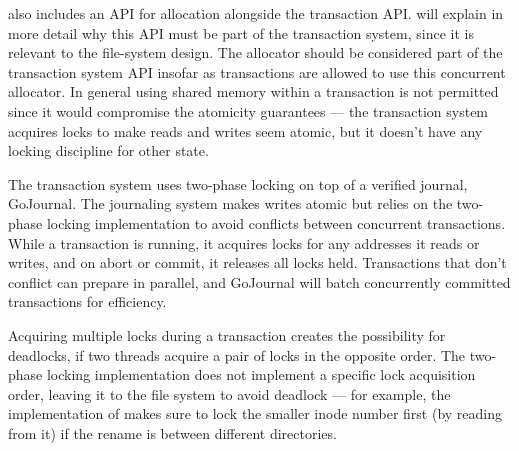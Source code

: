  also includes an API for allocation alongside the
transaction API.\@ {} will explain in more detail why this
API must be part of the transaction system, since it is relevant to the
file-system design. The allocator should be considered part of the transaction
system API insofar as transactions are allowed to use this concurrent allocator.
In general using shared memory within a transaction is not permitted since it
would compromise the atomicity guarantees --- the transaction system acquires
locks to make reads and writes seem atomic, but it doesn't have any locking
discipline for other state.



The transaction system uses two-phase locking on top of a verified journal,
GoJournal. The journaling system makes writes atomic but relies on the two-phase
locking implementation to avoid conflicts between concurrent transactions.
While a transaction is running, it acquires locks for
any addresses it reads or writes, and on abort or commit, it releases
all locks held. Transactions that don't conflict can prepare in
parallel, and GoJournal will batch concurrently committed
transactions for efficiency.

Acquiring multiple locks during a transaction creates the possibility
for deadlocks, if two threads acquire a pair of locks in the opposite
order. The two-phase locking implementation does not implement a
specific lock acquisition order, leaving it to the file system to
avoid deadlock --- for example, the implementation of 
makes sure to lock the smaller inode number first (by reading from it) if the
rename is between different directories.
